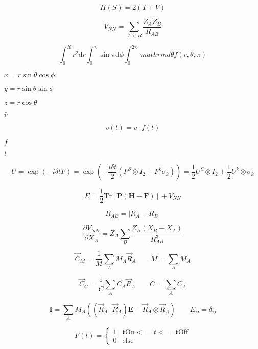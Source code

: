 \documentclass{article}
\begin{document}
\[ H(S) = 2(T + V) \]
\pagebreak

\[
  V_{NN} = \sum_{A < B} \frac{Z_A Z_B}{R_{AB}}
\]
\pagebreak

\[
  \int_0^R r^2 \mathrm{d}r \int_0^\pi \sin\pi \mathrm{d}\phi \int_0^{2\pi}\ mathrm{d}\theta
    f(r,\theta,\pi)
\]
\pagebreak

$ x = r \sin\theta \cos\phi $
\pagebreak

$ y = r \sin\theta \sin\phi $
\pagebreak

$ z = r \cos\theta $
\pagebreak

$ \hat{v} $
\pagebreak

\[
  v(t) = \hat{v} \cdot f(t)
\]
\pagebreak

$ f $
\pagebreak

$ t $
\pagebreak

\[
  U = \exp\left( -i \delta t F \right) 
    = \exp\left( -\frac{i\delta t}{2} 
                  \left(F^S \otimes I_2 + F^k \sigma_k\right) \right) 
    = \frac{1}{2}U^S \otimes I_2 + \frac{1}{2} U^k \otimes \sigma_k
\]
\pagebreak

\[
   E = \frac{1}{2} \mathrm{Tr}[\mathbf{P}(\mathbf{H} + \mathbf{F})] +
   V_{NN}
\]
\pagebreak

\[
  R_{AB} = \vert R_A - R_B \vert
\]
\pagebreak

\[
  \frac{\partial V_{NN}}{\partial X_A} = 
     Z_A \sum_B \frac{Z_B (X_B - X_A)}{R_{AB}^3}
\]
\pagebreak

\[
  \vec{C}_M = \frac{1}{M} \sum_A M_A \vec{R}_A \qquad M = \sum_A M_A
\]
\pagebreak

\[
  \vec{C}_C = \frac{1}{C} \sum_A C_A \vec{R}_A \qquad C = \sum_A C_A
\]
\pagebreak

\[
  \mathbf{I} = \sum_A M_A \left(
    \left(\vec{R}_A \cdot \vec{R}_A \right)\mathbf{E} - 
    \vec{R}_A \otimes \vec{R}_A
  \right) \qquad E_{ij} = \delta_{ij}
\]
\pagebreak

\[
  F(t) = \begin{cases}
            1 &  \mathrm{tOn} <= t <= \mathrm{tOff} \\
            0 &  \mathrm{else}
         \end{cases}
\]
\pagebreak
\end{document}
